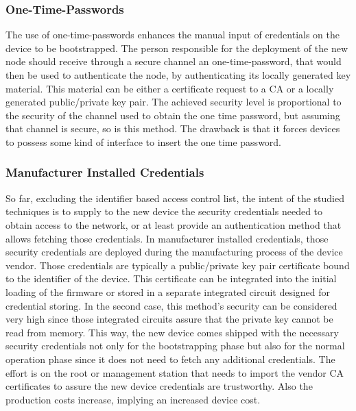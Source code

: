 \documentclass{sig-alternate-05-2015}
\begin{document}
\subsubsection{One-Time-Passwords}
The use of one-time-passwords enhances the manual input of credentials on the device to be bootstrapped. The person responsible for the deployment of the new node should receive through a secure channel an one-time-password, that would then be used to authenticate the node, by authenticating its locally generated key material. This material can be either a certificate request to a \gls{CA} or a locally generated public/private key pair. The achieved security level is proportional to the security of the channel used to obtain the one time password, but assuming that channel is secure, so is this method. The drawback is that it forces devices to possess some kind of interface to insert the one time password.

\subsubsection{Manufacturer Installed Credentials}
So far, excluding the identifier based access control list, the intent of the studied techniques is to supply to the new device the security credentials needed to obtain access to the network, or at least provide an authentication method that allows fetching those credentials. In manufacturer installed credentials, those security credentials are deployed during the manufacturing process of the device vendor. Those credentials are typically a public/private key pair certificate bound to the identifier of the device. This certificate can be integrated into the initial loading of the firmware or stored in a separate integrated circuit designed for credential storing. In the second case, this method's security can be considered very high since those integrated circuits assure that the private key cannot be read from memory. This way, the new device comes shipped with the necessary security credentials not only for the bootstrapping phase but also for the normal operation phase since it does not need to fetch any additional credentials. The effort is on the root or management station that needs to import the vendor \gls{CA} certificates to assure the new device credentials are trustworthy. Also the production costs increase, implying an increased device cost.
\end{document}
